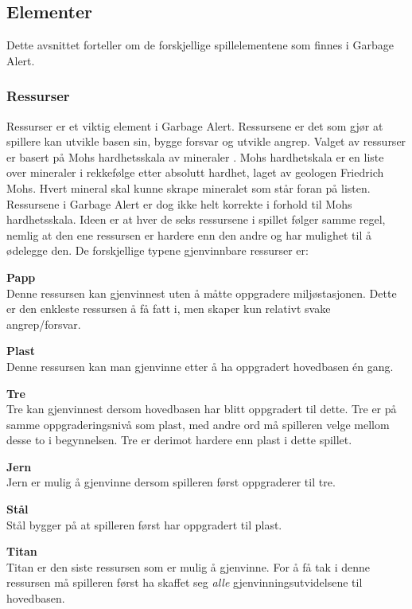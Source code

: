 




\subsection{Elementer} \label{sec:spillelement}
Dette avsnittet forteller om de forskjellige spillelementene som finnes
i Garbage Alert.

\subsubsection{Ressurser}
Ressurser er et viktig element i Garbage Alert. Ressursene er det som
gjør at spillere kan utvikle basen sin, bygge forsvar og utvikle angrep.
Valget av ressurser er basert på Mohs hardhetsskala av mineraler \cite{mohs}. Mohs hardhetskala er en liste over mineraler i rekkefølge etter absolutt hardhet, laget av geologen Friedrich Mohs. Hvert mineral skal kunne skrape mineralet som står foran på listen. Ressursene i Garbage Alert er dog ikke helt korrekte i forhold til Mohs hardhetsskala. Ideen er at hver de seks ressursene i spillet følger samme regel, nemlig at den ene ressursen er hardere enn den andre og har mulighet til å ødelegge den. 
De forskjellige typene gjenvinnbare ressurser er:

\begin{description}
	\item \textbf{Papp}\\ Denne ressursen kan gjenvinnest uten å måtte oppgradere miljøstasjonen. Dette er den enkleste ressursen å få fatt i, men skaper kun relativt svake angrep/forsvar.
	\item \textbf{Plast}\\ Denne ressursen kan man gjenvinne etter å ha oppgradert hovedbasen én gang.
	\item \textbf{Tre}\\ Tre kan gjenvinnest dersom hovedbasen har blitt oppgradert til dette. Tre er på samme oppgraderingsnivå som plast, med andre ord må spilleren velge mellom desse to i begynnelsen. Tre er derimot hardere enn plast i dette spillet.
	\item \textbf{Jern}\\ Jern er mulig å gjenvinne dersom spilleren først oppgraderer til tre.
	\item \textbf{Stål}\\ Stål bygger på at spilleren først har oppgradert til plast.
	\item \textbf{Titan}\\ Titan er den siste ressursen som er mulig å gjenvinne. For å få tak i denne ressursen må spilleren først ha skaffet seg \emph{alle} gjenvinningsutvidelsene til hovedbasen.
\end{description}


